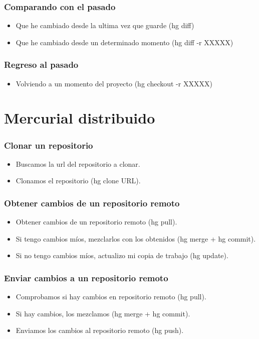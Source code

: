 \documentclass[10pt]{beamer}
\begin{document}
  \begin{frame}[containsverbatim]
    \frametitle{Comparando con el pasado}
    \begin{itemize}
        \item Que he cambiado desde la ultima vez que guarde (hg diff)
        \item Que he cambiado desde un determinado momento (hg diff -r XXXXX)
    \end{itemize}
  \end{frame}

  \begin{frame}[containsverbatim]
    \frametitle{Regreso al pasado}
    \begin{itemize}
        \item Volviendo a un momento del proyecto (hg checkout -r XXXXX)
    \end{itemize}
  \end{frame}

  \section*{Mercurial distribuido}

  \begin{frame}[containsverbatim]
    \frametitle{Clonar un repositorio}
    \begin{itemize}
      \item Buscamos la url del repositorio a clonar.
      \item Clonamos el repositorio (hg clone URL).
    \end{itemize}
  \end{frame}

  \begin{frame}[containsverbatim]
    \frametitle{Obtener cambios de un repositorio remoto}
    \begin{itemize}
      \item Obtener cambios de un repositorio remoto (hg pull).
      \item Si tengo cambios míos, mezclarlos con los obtenidos (hg merge + hg commit).
      \item Si no tengo cambios míos, actualizo mi copia de trabajo (hg update).
    \end{itemize}
  \end{frame}

  \begin{frame}[containsverbatim]
    \frametitle{Enviar cambios a un repositorio remoto}
    \begin{itemize}
      \item Comprobamos si hay cambios en repositorio remoto (hg pull).
      \item Si hay cambios, los mezclamos (hg merge + hg commit).
      \item Enviamos los cambios al repositorio remoto (hg push).
    \end{itemize}
  \end{frame}
\end{document}

